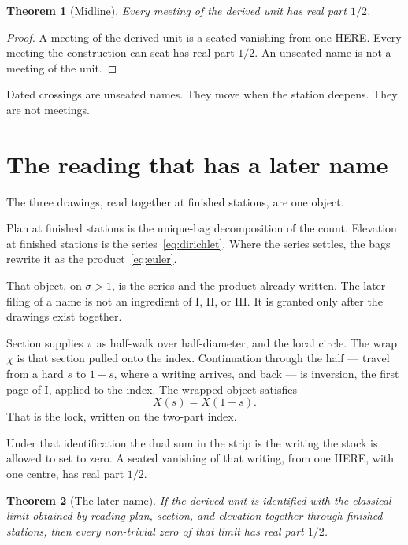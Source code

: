 \documentclass[10pt,a4paper]{article}
\theoremstyle{plain}
\newtheorem{theorem}{Theorem}
\theoremstyle{definition}
\begin{document}
\begin{theorem}[Midline]
Every meeting of the derived unit has real part $1/2$.
\end{theorem}

\begin{proof}
A meeting of the derived unit is a seated vanishing from one HERE.
Every meeting the construction can seat has real part $1/2$.
An unseated name is not a meeting of the unit.
\end{proof}

Dated crossings are unseated names.
They move when the station deepens.
They are not meetings.

\section{The reading that has a later name}

The three drawings, read together at finished stations, are one object.

Plan at finished stations is the unique-bag decomposition of the count.
Elevation at finished stations is the series~\eqref{eq:dirichlet}.
Where the series settles, the bags rewrite it as the product~\eqref{eq:euler}.

That object, on $\sigma>1$, is the series and the product already written.
The later filing of a name is not an ingredient of I, II, or III.
It is granted only after the drawings exist together.

Section supplies $\pi$ as half-walk over half-diameter, and the local circle.
The wrap $\chi$ is that section pulled onto the index.
Continuation through the half --- travel from a hard $s$ to $1-s$, where a writing arrives, and back --- is inversion, the first page of I, applied to the index.
The wrapped object satisfies
\[
X(s)=X(1-s).
\]
That is the lock, written on the two-part index.

Under that identification the dual sum in the strip is the writing the stock is allowed to set to zero.
A seated vanishing of that writing, from one HERE, with one centre, has real part $1/2$.

\begin{theorem}[The later name]
If the derived unit is identified with the classical limit obtained by reading plan, section, and elevation together through finished stations, then every non-trivial zero of that limit has real part $1/2$.
\end{theorem}
\end{document}
